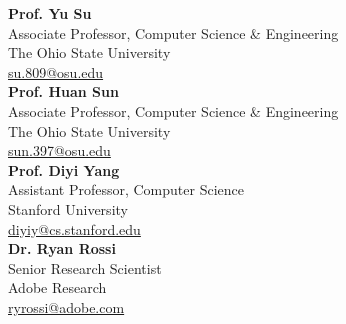 \textbf{Prof. Yu Su} \\
Associate Professor, Computer Science \& Engineering \\
The Ohio State University \\
\href{mailto:su.809@osu.edu}{su.809@osu.edu} \\[0.6em]
\textbf{Prof. Huan Sun} \\
Associate Professor, Computer Science \& Engineering \\
The Ohio State University \\
\href{mailto:sun.397@osu.edu}{sun.397@osu.edu} \\[0.6em]
\textbf{Prof. Diyi Yang} \\
Assistant Professor, Computer Science \\
Stanford University \\
\href{mailto:diyiy@cs.stanford.edu}{diyiy@cs.stanford.edu} \\[0.6em]
\textbf{Dr. Ryan Rossi} \\
Senior Research Scientist \\
Adobe Research \\
\href{mailto:ryrossi@adobe.com}{ryrossi@adobe.com}
